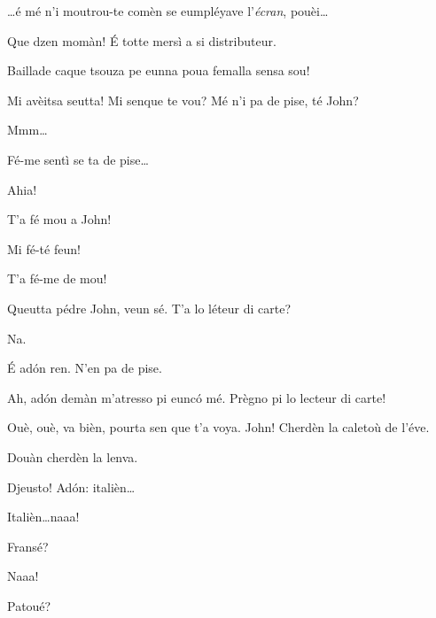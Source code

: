 \begin{drama}

\Jackspeaks \ldots é mé n'i moutrou-te comèn se eumpléyave l'\textit{écran}, pouèi\ldots


\Johnspeaks Que dzen momàn!  \'E totte mersì a si distributeur.


\Matassaspeaks Baillade caque tsouza pe eunna poua femalla sensa sou!

\Jackspeaks Mi avèitsa seutta! Mi senque te vou?  Mé n'i pa de pise, té John?

\Johnspeaks Mmm\ldots

\Jackspeaks\direct{\malisieu} Fé-me sentì se ta de pise\ldots


\Johnspeaks Ahia!

\Jackspeaks{} T'a fé mou a John! \malecha

\Prosperospeaks{} Mi fé-té feun!

\Johnspeaks T'a fé-me de mou!

\Jackspeaks Queutta pédre John, veun sé.  T'a lo léteur di carte?

\Matassaspeaks Na.

\Jackspeaks \'E ad\'on ren. N'en pa de pise.

\Matassaspeaks Ah, ad\'on demàn m'atresso pi eunc\'o mé. Prègno pi lo lecteur di carte!

\Jackspeaks  Ouè, ouè, va bièn, pourta sen que t'a voya.  John! Cherdèn la caletoù de l'éve.

\Johnspeaks Douàn cherdèn la lenva.

\Jackspeaks  Djeusto! Ad\'on: italièn\ldots

\Johnspeaks Italièn\ldots naaa!


\Jackspeaks Fransé?

\Johnspeaks Naaa!

\Jackspeaks Patoué?


\end{drama}
